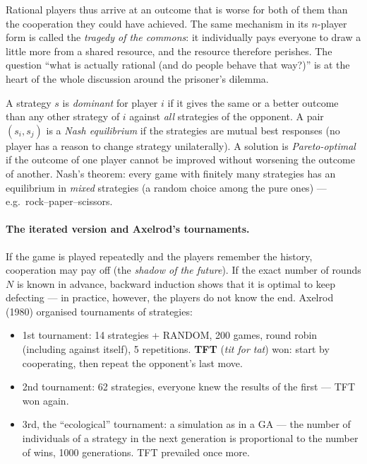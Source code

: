 \documentclass[11pt,a4paper]{article}
\theoremstyle{definition}
\providecommand{\uv}[1]{``#1''}
\begin{document}
Rational players thus arrive at an outcome that is worse for both of them than
the cooperation they could have achieved. The same mechanism in its $n$-player
form is called the \emph{tragedy of the commons}: it individually pays everyone
to draw a little more from a shared resource, and the resource therefore
perishes. The question \uv{what is actually rational (and do people behave that
way?)} is at the heart of the whole discussion around the prisoner's dilemma.

\begin{defbox}
A strategy $s$ is \emph{dominant} for player $i$ if it gives the same or a
better outcome than any other strategy of $i$ against \emph{all} strategies of
the opponent. A pair $(s_i, s_j)$ is a \emph{Nash equilibrium} if the strategies
are mutual best responses (no player has a reason to change strategy
unilaterally). A solution is \emph{Pareto-optimal} if the outcome of one player
cannot be improved without worsening the outcome of another.
Nash's theorem: every game with finitely many strategies has an equilibrium in
\emph{mixed} strategies (a random choice among the pure ones) --- e.g.\
rock--paper--scissors.
\end{defbox}

\paragraph{The iterated version and Axelrod's tournaments.} If the game is
played repeatedly and the players remember the history, cooperation may pay off
(the \emph{shadow of the future}). If the exact number of rounds $N$ is known in
advance, backward induction shows that it is optimal to keep defecting --- in
practice, however, the players do not know the end. Axelrod (1980) organised
tournaments of strategies:
\begin{itemize}
\item 1st tournament: 14 strategies + RANDOM, 200 games, round robin (including
  against itself), 5 repetitions. \textbf{TFT} (\emph{tit for tat}) won: start
  by cooperating, then repeat the opponent's last move.
\item 2nd tournament: 62 strategies, everyone knew the results of the first ---
  TFT won again.
\item 3rd, the \uv{ecological} tournament: a simulation as in a GA --- the
  number of individuals of a strategy in the next generation is proportional to
  the number of wins, 1000 generations. TFT prevailed once more.
\end{itemize}
\end{document}
